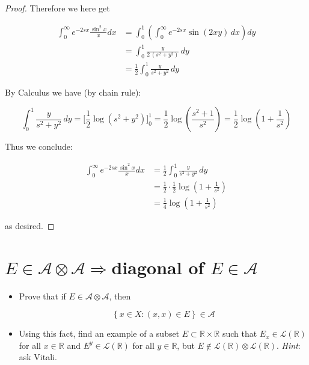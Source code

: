 \documentclass{qlnotes-export}
\begin{document}
\begin{proof}
Therefore we here get

\[\begin{matrix}
{\int_{0}^{\infty}e^{- 2sx}\frac{\sin^{2}x}{x} dx} & {= \int_{0}^{1}(\int_{0}^{\infty}e^{- 2sx}\sin(2xy)\, dx)dy} \\
 & {= \int_{0}^{1}\frac{y}{2\,(s^{2} + y^{2})}\, dy} \\
 & {= \frac{1}{2}\int_{0}^{1}\frac{y}{s^{2} + y^{2}}\, dy}
\end{matrix}\]

By Calculus we have (by chain rule):

\[\int_{0}^{1}\frac{y}{s^{2} + y^{2}}\, dy = \lbrack\frac{1}{2}\log(s^{2} + y^{2})\rbrack_{0}^{1} = \frac{1}{2}\log(\frac{s^{2} + 1}{s^{2}}) = \frac{1}{2}\log(1 + \frac{1}{s^{2}})\]

Thus we conclude:

\[\begin{matrix}
{\int_{0}^{\infty}e^{- 2sx}\frac{\sin^{2}x}{x} dx} & {= \frac{1}{2}\int_{0}^{1}\frac{y}{s^{2} + y^{2}}\, dy} \\
 & {= \frac{1}{2} \cdot \frac{1}{2}\log(1 + \frac{1}{s^{2}})} \\
 & {= \frac{1}{4}\log(1 + \frac{1}{s^{2}})}
\end{matrix}\]

as desired.

\end{proof}

\section{\texorpdfstring{\(E \in \mathcal{A} \otimes \mathcal{A}\Longrightarrow\)diagonal of \(E \in \mathcal{A}\)}{E \textbackslash in \textbackslash mathcal\{A\} \textbackslash otimes \textbackslash mathcal\{A\}\textbackslash Longrightarrowdiagonal of E \textbackslash in \textbackslash mathcal\{A\}}}\label{einmathcalaotimesmathcala-impliesdiagonal-of-e-in-mathcala}

\begin{itemize}
\item
  Prove that if \(E \in \mathcal{A} \otimes \mathcal{A}\), then

  \[\left\{ {x \in X:(x,x) \in E} \right\} \in \mathcal{A}\]
\item
  Using this fact, find an example of a subset \(E \subset {\mathbb{R}} \times {\mathbb{R}}\) such that \(E_{x} \in \mathcal{L}({\mathbb{R}})\) for all \(x \in {\mathbb{R}}\) and \(E^{y} \in \mathcal{L}({\mathbb{R}})\) for all \(y \in {\mathbb{R}}\), but \(E \notin \mathcal{L}({\mathbb{R}}) \otimes \mathcal{L}({\mathbb{R}})\). \emph{Hint}: ask Vitali.
\end{itemize}
\end{document}

